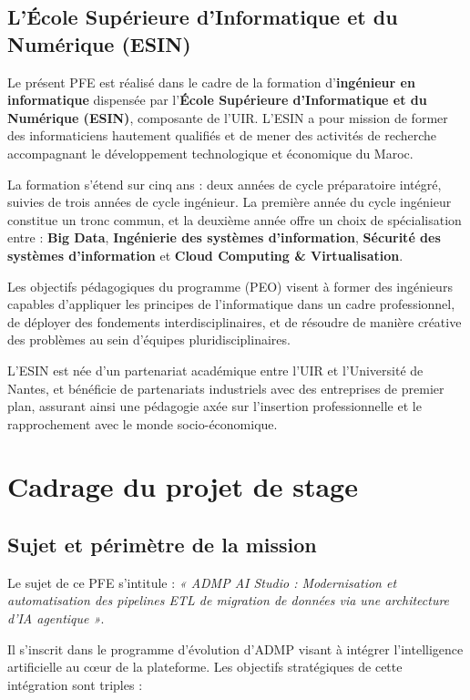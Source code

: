 \subsection{L'École Supérieure d'Informatique et du Numérique (ESIN)}
\label{subsec:esin}

Le présent PFE est réalisé dans le cadre de la formation d'\textbf{ingénieur en informatique} dispensée par l'\textbf{École Supérieure d'Informatique et du Numérique (ESIN)}, composante de l'UIR. L'ESIN a pour mission de former des informaticiens hautement qualifiés et de mener des activités de recherche accompagnant le développement technologique et économique du Maroc.

La formation s'étend sur cinq ans : deux années de cycle préparatoire intégré, suivies de trois années de cycle ingénieur. La première année du cycle ingénieur constitue un tronc commun, et la deuxième année offre un choix de spécialisation entre : \textbf{Big Data}, \textbf{Ingénierie des systèmes d'information}, \textbf{Sécurité des systèmes d'information} et \textbf{Cloud Computing \& Virtualisation}.

Les objectifs pédagogiques du programme (PEO) visent à former des ingénieurs capables d'appliquer les principes de l'informatique dans un cadre professionnel, de déployer des fondements interdisciplinaires, et de résoudre de manière créative des problèmes au sein d'équipes pluridisciplinaires.

L'ESIN est née d'un partenariat académique entre l'UIR et l'Université de Nantes, et bénéficie de partenariats industriels avec des entreprises de premier plan, assurant ainsi une pédagogie axée sur l'insertion professionnelle et le rapprochement avec le monde socio-économique.


\section{Cadrage du projet de stage}

\subsection{Sujet et périmètre de la mission}

Le sujet de ce PFE s'intitule : \textit{« ADMP AI Studio : Modernisation et automatisation des pipelines ETL de migration de données via une architecture d'IA agentique »}.

Il s'inscrit dans le programme d'évolution d'ADMP visant à intégrer l'intelligence artificielle au cœur de la plateforme. Les objectifs stratégiques de cette intégration sont triples :

